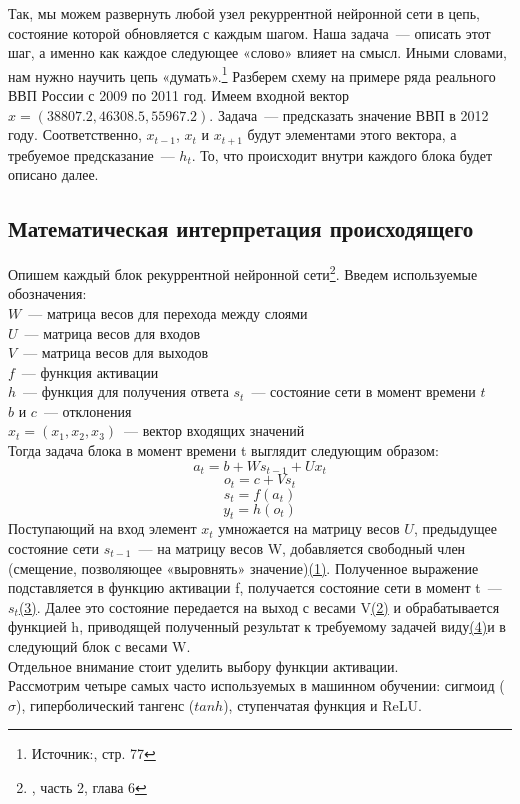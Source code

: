 \documentclass[12pt, a4paper]{article}
\begin{document}
Так, мы можем развернуть любой узел рекуррентной нейронной сети в цепь, состояние которой обновляется с каждым шагом. Наша задача~--- описать этот шаг, а именно как каждое следующее «слово» влияет на смысл. Иными словами, нам нужно научить цепь «думать».\footnote{Источник:\cite{TensorFlow}, стр. 77}
Разберем схему на примере ряда реального ВВП России с 2009 по 2011 год. Имеем входной вектор $x = (38807.2, 46308.5, 55967.2)$. Задача~--- предсказать значение ВВП в 2012 году. Соответственно, $x_{t-1}$, $x_t$ и $x_{t+1}$ будут элементами этого вектора, а требуемое предсказание~--- $h_t$. То, что происходит внутри каждого блока будет описано далее.

\subsection{Математическая интерпретация происходящего}

Опишем каждый блок рекуррентной нейронной сети\footnote{\cite{TensorFlow}, часть 2, глава 6}.
Введем используемые обозначения:\\
$W$~--- матрица весов для перехода между слоями\\
$U$~--- матрица весов для входов\\
$V$~--- матрица весов для выходов\\
$f$~--- функция активации\\
$h$~--- функция для получения ответа
$s_t$~--- состояние сети в момент времени $t$\\
$b$ и $c$~--- отклонения\\
$x_t = (x_1, x_2, x_3)$~--- вектор входящих значений\\
Тогда задача блока в момент времени t выглядит следующим образом:
\begin{equation}\label{formula}
a_t = b + W s_{t-1} + U x_t
\end{equation}
\begin{equation}\label{formula1}
o_t = c + V s_t
\end{equation}
\begin{equation}\label{formula2}
s_t = f(a_t)
\end{equation}
\begin{equation}\label{formula3}
y_t = h(o_t)
\end{equation}
Поступающий на вход элемент $x_t$ умножается на матрицу весов $U$, предыдущее состояние сети $s_{t-1}$~--- на матрицу весов W, добавляется свободный член (смещение, позволяющее «выровнять» значение)\hyperref[formula]{(1)}. Полученное выражение подставляется в функцию активации f, получается состояние сети в момент t~---  $s_t$\hyperref[formula2]{(3)}. Далее это состояние передается на выход с весами V\hyperref[formula1]{(2)} и обрабатывается функцией h, приводящей полученный результат к требуемому задачей виду\hyperref[formula3]{(4)}и в следующий блок с весами W.\\
Отдельное внимание стоит уделить выбору функции активации.\\
Рассмотрим четыре самых часто используемых в машинном обучении: сигмоид ($\sigma$), гиперболический тангенс ($tanh$), ступенчатая функция и ReLU.\\
\end{document}
